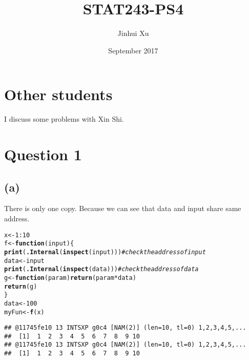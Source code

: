 \documentclass{article}\usepackage[]{graphicx}\usepackage[]{color}
\makeatletter
\newcommand{\hlnum}[1]{\textcolor[rgb]{0.686,0.059,0.569}{#1}}%
\newcommand{\hlcom}[1]{\textcolor[rgb]{0.678,0.584,0.686}{\textit{#1}}}%
\newcommand{\hlopt}[1]{\textcolor[rgb]{0,0,0}{#1}}%
\newcommand{\hlstd}[1]{\textcolor[rgb]{0.345,0.345,0.345}{#1}}%
\newcommand{\hlkwa}[1]{\textcolor[rgb]{0.161,0.373,0.58}{\textbf{#1}}}%
\newcommand{\hlkwb}[1]{\textcolor[rgb]{0.69,0.353,0.396}{#1}}%
\newcommand{\hlkwc}[1]{\textcolor[rgb]{0.333,0.667,0.333}{#1}}%
\newcommand{\hlkwd}[1]{\textcolor[rgb]{0.737,0.353,0.396}{\textbf{#1}}}%
\newenvironment{kframe}{%
 \def\at@end@of@kframe{}%
 \ifinner\ifhmode%
  \def\at@end@of@kframe{\end{minipage}}%
  \begin{minipage}{\columnwidth}%
 \fi\fi%
 \def\FrameCommand##1{\hskip\@totalleftmargin \hskip-\fboxsep
 \colorbox{shadecolor}{##1}\hskip-\fboxsep
     \hskip-\linewidth \hskip-\@totalleftmargin \hskip\columnwidth}%
 \MakeFramed {\advance\hsize-\width
   \@totalleftmargin\z@ \linewidth\hsize
   \@setminipage}}%
 {\par\unskip\endMakeFramed%
 \at@end@of@kframe}
\newenvironment{knitrout}{}{} %
\makeatother
\begin{document}
 
\title{STAT243-PS4}
\author{Jinhui Xu}
\date{September 2017}

\maketitle

\section{Other students}
I discuss some problems with Xin Shi.  

\section{Question 1}

\subsection{(a)}
There is only one copy. Because we can see that data and input share same address.
\begin{knitrout}
\color{fgcolor}\begin{kframe}
\begin{alltt}
\hlstd{x} \hlkwb{<-} \hlnum{1}\hlopt{:}\hlnum{10}
\hlstd{f} \hlkwb{<-} \hlkwa{function}\hlstd{(}\hlkwc{input}\hlstd{)\{}
  \hlkwd{print}\hlstd{(}\hlkwd{.Internal}\hlstd{(}\hlkwd{inspect}\hlstd{(input)))}       \hlcom{#check the address of input}
  \hlstd{data} \hlkwb{<-} \hlstd{input}
  \hlkwd{print}\hlstd{(}\hlkwd{.Internal}\hlstd{(}\hlkwd{inspect}\hlstd{(data)))}        \hlcom{#check the address of data}
        \hlstd{g} \hlkwb{<-} \hlkwa{function}\hlstd{(}\hlkwc{param}\hlstd{)} \hlkwd{return}\hlstd{(param} \hlopt{*} \hlstd{data)}
        \hlkwd{return}\hlstd{(g)}
\hlstd{\}}
\hlstd{data}\hlkwb{<-}\hlnum{100}
\hlstd{myFun} \hlkwb{<-} \hlkwd{f}\hlstd{(x)}
\end{alltt}
\begin{verbatim}
## @11745fe10 13 INTSXP g0c4 [NAM(2)] (len=10, tl=0) 1,2,3,4,5,...
##  [1]  1  2  3  4  5  6  7  8  9 10
## @11745fe10 13 INTSXP g0c4 [NAM(2)] (len=10, tl=0) 1,2,3,4,5,...
##  [1]  1  2  3  4  5  6  7  8  9 10
\end{verbatim}
\end{kframe}
\end{knitrout}
\end{document}
